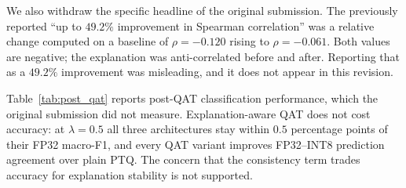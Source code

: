 \documentclass[fleqn,10pt]{wlscirep}
\begin{document}
We also withdraw the specific headline of the original submission. The previously reported ``up to $49.2\%$ improvement in Spearman correlation'' was a relative change computed on a baseline of $\rho = -0.120$ rising to $\rho = -0.061$. Both values are negative; the explanation was anti-correlated before and after. Reporting that as a $49.2\%$ improvement was misleading, and it does not appear in this revision.

Table~\ref{tab:post_qat} reports post-QAT classification performance, which the original submission did not measure. Explanation-aware QAT does not cost accuracy: at $\lambda = 0.5$ all three architectures stay within $0.5$ percentage points of their FP32 macro-F1, and every QAT variant improves FP32--INT8 prediction agreement over plain PTQ. The concern that the consistency term trades accuracy for explanation stability is not supported.
\end{document}
